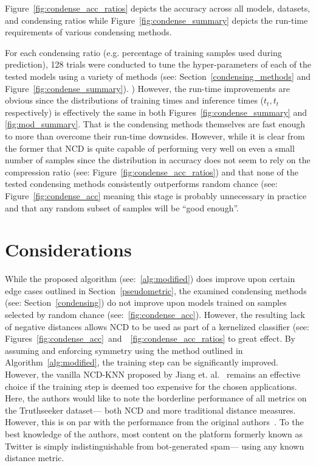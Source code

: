 \documentclass[conference]{IEEEtran}
\begin{document}
Figure~\ref{fig:condense_acc_ratios} depicts the accuracy across all models, datasets, and condensing ratios while Figure~\ref{fig:condense_summary} depicts the run-time requirements of various condensing methods. 

For each condensing ratio (e.g. percentage of training samples used during prediction), 128 trials were conducted to tune the hyper-parameters of each of the tested models using a variety of methods (see: Section~\ref{condensing_methods} and Figure~\ref{fig:condense_summary}). 
) However, the run-time improvements are obvious since the distributions of training times and inference times ($t_t, t_t$ respectively) is effectively the same in both Figures~\ref{fig:condense_summary} and \ref{fig:mod_summary}. That is the condensing methods themselves are fast enough to more than overcome their run-time downsides. However, while it is clear from the former that NCD is quite capable of performing very well on even a small number of samples since the distribution in accuracy does not seem to rely on the compression ratio (see: Figure~\ref{fig:condense_acc_ratios}) and that none of the tested condensing methods consistently outperforms random chance (see: Figure~\ref{fig:condense_acc} meaning this stage is probably unnecessary in practice and that any random subset of samples will be ``good enough''. 

\vspace{-1em}
\section{Considerations}
\label{considerations}
While the proposed algorithm (see:~\ref{alg:modified}) does improve upon certain edge cases outlined in Section~\ref{pseudometric}, the examined condensing methods (see: Section~\ref{condensing}) do not improve upon models trained on samples selected by random chance (see:~\ref{fig:condense_acc}). However, the resulting lack of negative distances allows NCD to be used as part of a kernelized classifier (see: Figures~\ref{fig:condense_acc}~and~~\ref{fig:condense_acc_ratios} to great effect. 
By assuming and enforcing symmetry using the method outlined in Algorithm~\ref{alg:modified}, the training step can be significantly improved.
However, the vanilla NCD-KNN proposed by Jiang et. al.~\cite{jiang2022less} remains an effective choice if the training step is deemed too expensive for the chosen applications.
Here, the authors would like to note the borderline performance of all metrics on the Truthseeker dataset--- both NCD and more traditional distance measures. However, this is on par with the performance from the original authors~\cite{truthseeker}. To the best knowledge of the authors, most content on the platform formerly known as Twitter is simply indistinguishable from bot-generated spam--- using any known distance metric.
\end{document}
